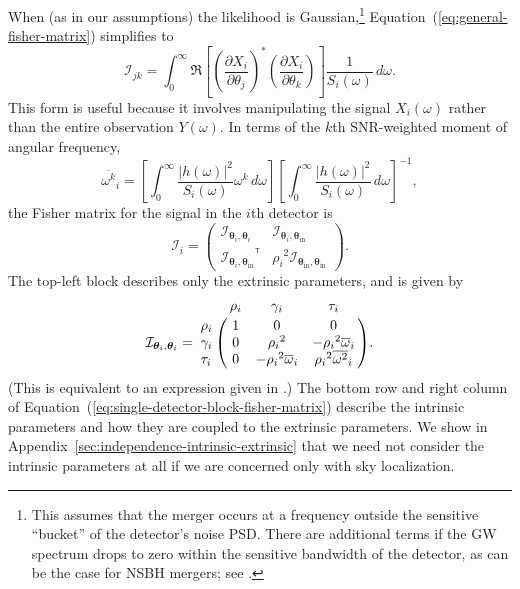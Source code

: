 \documentclass[amsmath,amssymb,aps,prx,reprint,nopreprintnumbers,nofootinbib,showpacs]{revtex4-1}
\newcommand\transpose{\ensuremath{^{^\mathsf{T}}}}
\begin{document}
When (as in our assumptions) the likelihood is Gaussian,\footnote{This assumes that the merger occurs at a frequency outside the sensitive ``bucket'' of the detector's noise \ac{PSD}. There are additional terms if the \ac{GW} spectrum drops to zero within the sensitive bandwidth of the detector, as can be the case for \ac{NSBH} mergers; see \cite{2014CQGra..31o5005M}.} Equation~(\ref{eq:general-fisher-matrix}) simplifies to
%
\begin{equation}\label{eq:gaussian-fisher-matrix}
    \mathcal{I}_{jk} = \int_0^\infty \Re \left[
        \left(\frac{\partial X_i}{\partial \theta_j}\right)^*
        \left(\frac{\partial X_i}{\partial \theta_k}\right)
    \right] \frac{1}{S_i(\omega)} \, d\omega.
\end{equation}
%
This form is useful because it involves manipulating the signal $X_i (\omega)$ rather than the entire observation $Y (\omega)$. In terms of the $k$th \ac{SNR}-weighted moment of angular frequency,
%
\begin{equation}\label{eq:angular-frequency-moments}
    {\overline{\omega^k}}_i =
        \left[ \int_0^\infty \frac{|h (\omega)|^2}{S_i(\omega)} \omega^k \, d\omega \right]
        \left[ \int_0^\infty \frac{|h (\omega)|^2}{S_i(\omega)} \, d\omega \right]^{-1},
\end{equation}
%
the Fisher matrix for the signal in the $i$th detector is
%
\begin{equation}
    \label{eq:single-detector-block-fisher-matrix}
    \mathcal{I}_i = \left(
        \begin{array}{cc}
            \mathcal{I}_{\bm\theta_i,\bm\theta_i} &
            \mathcal{I}_{\bm\theta_i,\bm\theta_\mathrm{in}} \\
            {\mathcal{I}_{\bm\theta_i,\bm\theta_\mathrm{in}}}\transpose &
            {\rho_i}^2 \mathcal{I}_{\bm\theta_\mathrm{in},\bm\theta_\mathrm{in}}
        \end{array}
    \right).
\end{equation}
%
The top-left block describes only the extrinsic parameters, and is given by
%
\begin{equation}\label{eq:fisher-matrix}
    \mathcal{I}_{\bm\theta_i,\bm\theta_i} = \bordermatrix{
        ~ & \rho_i & \gamma_i & \tau_i \cr
        \rho_i & 1 & 0 & 0 \cr
        \gamma_i & 0 & {\rho_i}^2 & -{\rho_i}^2 {\overline{\omega}}_i \cr
        \tau_i & 0 & -{\rho_i}^2 {\overline{\omega}}_i & {\rho_i}^2 {\overline{\omega^2}}_i
    }.
\end{equation}
%
(This is equivalent to an expression given in \cite{Grover:2013}.) The bottom row and right column of Equation~(\ref{eq:single-detector-block-fisher-matrix}) describe the intrinsic parameters and how they are coupled to the extrinsic parameters. We show in Appendix~\ref{sec:independence-intrinsic-extrinsic} that we need not consider the intrinsic parameters at all if we are concerned only with sky localization.
\end{document}
